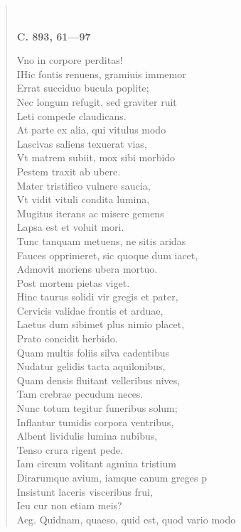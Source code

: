 \documentclass[11pt, a4paper]{report}
\begin{document}
\begin{verse}
        ﻿\pagebreak 
    \begin{center} \textbf{C. 893, 61—97} \end{center} \marginpar{[337]} Vno in corpore perditas! \\ IHic fontis renuens, gramiuis immemor \\ Errat succiduo bucula poplite; \\ Nec longum refugit, sed graviter ruit \\ Leti compede claudicans. \\ At parte ex alia, qui vitulus modo \\ Lascivas saliens texuerat vias, \\ Vt matrem subiit, mox sibi morbido \\ Pestem traxit ab ubere. \\ Mater tristifico vulnere saucia, \\ Vt vidit vituli condita lumina, \\ Mugitus iterans ac misere gemens \\ Lapsa est et voluit mori. \\ Tunc tanquam metuens, ne sitis aridas \\ Fauces opprimeret, sic quoque dum iacet, \\ Admovit  \lbrack moriens \rbrack  ubera mortuo. \\ Post mortem pietas viget. \\ Hinc taurus solidi vir gregis et pater, \\ Cervicis validae frontis et arduae, \\ Laetus dum sibimet plus nimio placet, \\ Prato concidit herbido. \\ Quam multis foliis silva cadentibus \\ Nudatur gelidis tacta aquilonibus, \\ Quam densis fluitant velleribus nives, \\ Tam crebrae pecudum neces. \\ Nunc totum tegitur funeribus solum; \\ Inflantur tumidis corpora ventribus, \\ Albent lividulis lumina nubibus, \\ Tenso crura rigent pede. \\ Iam circum volitant agmina tristium \\ Dirarumque avium, iamque canum greges p \\ Insistunt laceris visceribus frui, \\ Ieu cur non etiam meis? \\ Aeg. Quidnam, quaeso, quid est, quod vario modo \\ 

\end{verse}
\end{document}

